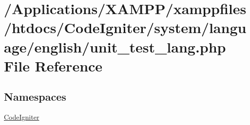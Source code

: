 \hypertarget{unit__test__lang_8php}{}\section{/\+Applications/\+X\+A\+M\+P\+P/xamppfiles/htdocs/\+Code\+Igniter/system/language/english/unit\+\_\+test\+\_\+lang.php File Reference}
\label{unit__test__lang_8php}
\subsection*{Namespaces}
\begin{DoxyCompactItemize}
\item 
 \mbox{\hyperlink{namespace_code_igniter}{Code\+Igniter}}
\end{DoxyCompactItemize}
